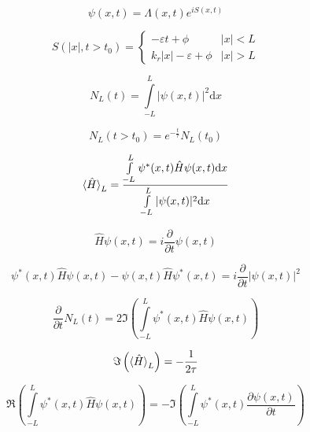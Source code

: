 \begin{equation}
  \psi(x,t) = \Lambda(x,t) e^{iS(x,t)}
\end{equation}

\begin{equation}
  S(|x|,t>t_0) = \begin{cases}
                   -\varepsilon t + \phi       & |x| < L \\
                   k_r |x| -\varepsilon + \phi & |x| > L
                 \end{cases}
\end{equation}


\begin{equation}
  N_L(t) = \int\limits_{-L}^L |\psi(x,t)|^2 \mathrm d x
\end{equation}

\begin{equation}
  N_L(t>t_0) = e^{-\frac t\tau} N_L(t_0)
\end{equation}

\begin{equation}
  \braket{\hat{H}}_L = \frac{\int\limits_{-L}^L \psi^*(x,t) \hat{H} \psi(x,t) \mathrm dx}
                       {\int\limits_{-L}^L |\psi(x,t)|^2 \mathrm dx}
\end{equation}

\begin{equation}
  \hat{H}\psi(x,t) = i \frac{\partial}{\partial t} \psi(x,t)
\end{equation}


\begin{equation}
  \psi^*(x,t) \hat{H} \psi(x,t) - \psi(x,t) \hat{H} \psi^*(x,t) = 
      i \frac{\partial}{\partial t} |\psi(x,t)|^2
\end{equation}

\begin{equation}
  \frac{\partial}{\partial t} N_L(t) = 2 \Im \left(
       \int\limits_{-L}^L \psi^*(x,t) \hat{H} \psi(x,t) \right)
\end{equation}

\begin{equation}
  \Im \left( \braket{\hat{H}}_L \right) = -\frac{1}{2\tau}
\end{equation}


\begin{equation}
  \Re \left( \int\limits_{-L}^L \psi^*(x,t) \hat{H} \psi(x,t) \right)
 = -\Im \left( \int\limits_{-L}^L \psi^*(x,t) \frac{\partial \psi(x,t)}{\partial t} \right)
\end{equation}


